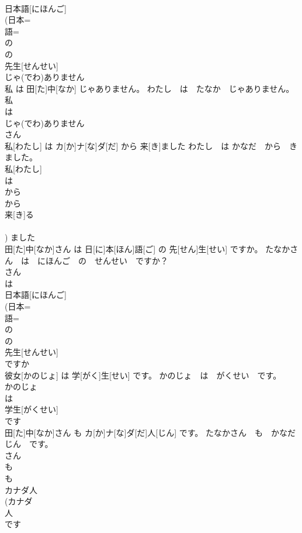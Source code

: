 \documentclass[8pt]{extreport}
\begin{document}
\begin{CJK}{UTF8}{min}
\\	日本語[にほんご] 
\\	(日本=
\\	語=
\\	の 
\\	の
\\	先生[せんせい] 
\\	じゃ(でわ)ありません 
\\	私 は 田[た]中[なか] じゃありません。	わたし　は　たなか　じゃありません。	
\\	私 
\\	は 
\\	じゃ(でわ)ありません 
\\	さん 
\\	私[わたし] は カ[か]ナ[な]ダ[だ] から 来[き]ました	わたし　は かなだ　から　きました。	
\\	私[わたし] 
\\	は 
\\	から 
\\	から 
\\	来[き]る 
\\	[くる] 
\\	[き])	ました 
\\	田[た]中[なか]さん は 日[に]本[ほん]語[ご] の 先[せん]生[せい] ですか。	たなかさん　は　にほんご　の　せんせい　ですか？	
\\	さん 
\\	は 
\\	日本語[にほんご] 
\\	(日本=
\\	語=
\\	の 
\\	の
\\	先生[せんせい] 
\\	ですか 
\\	彼女[かのじょ] は 学[がく]生[せい] です。	かのじょ　は　がくせい　です。	
\\	かのじょ 
\\	は 
\\	学生[がくせい] 
\\	です 
\\	田[た]中[なか]さん も カ[か]ナ[な]ダ[だ]人[じん] です。	たなかさん　も　かなだじん　です。	
\\	さん 
\\	も 
\\	も 
\\	カナダ人 
\\	(カナダ 
\\	人 
\\	です 

\end{CJK}
\end{document}
